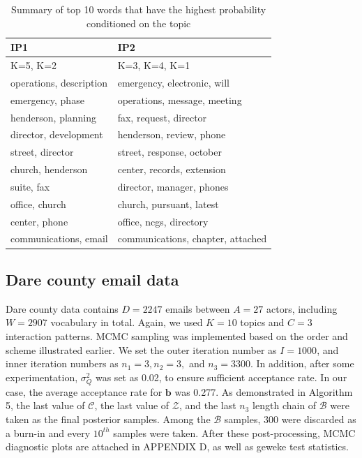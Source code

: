\documentclass[a4paper]{article}
\begin{document}
 \begin{table}[ht]
 	\centering
 	\begin{tabular}{|l||l||}
 		\hline
 		{\textbf{IP1} }&{\textbf{IP2} }\\
 		\hline\hline
 		K=5, K=2 & K=3, K=4, K=1\\
 		\hline
 	operations, description&emergency, electronic, will\\
 	emergency, phase & operations, message, meeting\\
 	henderson, planning& fax, request, director\\
 	director, development & henderson, review, phone\\
 	street, director & street, response, october\\
 	church, henderson& center, records, extension\\
 	suite, fax & director, manager, phones\\
 	office, church & church, pursuant, latest\\ 
 	center, phone & office, ncgs, directory\\
 	communications, email & communications, chapter, attached\\
 		\hline
 	\end{tabular}
 	\caption {Summary of top 10 words that have the highest probability conditioned on the topic}
 	\label{table:VancewordsMCMC}
 \end{table}
 \subsection{Dare county email data} \label{subsec: Dare county email data}
 Dare county data contains $D=2247$ emails between $A=27$ actors, including $W=2907$ vocabulary in total. Again, we used $K=10$ topics and $C=3$ interaction patterns. MCMC sampling was implemented based on the order and scheme illustrated earlier. We set the outer iteration number as $I=1000$, and inner iteration numbers as $n_1=3, n_2=3,$ and $n_3=3300$. In addition, after some experimentation, $\sigma^2_Q$ was set as 0.02, to ensure sufficient acceptance rate. In our case, the average acceptance rate for $\boldsymbol{b}$ was 0.277. As demonstrated in Algorithm 5, the last value of $\mathcal{C}$, the last value of $\mathcal{Z}$, and the last $n_3$ length chain of $\mathcal{B}$ were taken as the final posterior samples. Among the $\mathcal{B}$ samples, 300 were discarded as a burn-in and every $10^{th}$ samples were taken. After these post-processing, MCMC diagnostic plots are attached in APPENDIX D, as well as geweke test statistics. 


\newpage
\appendix
\end{document}
